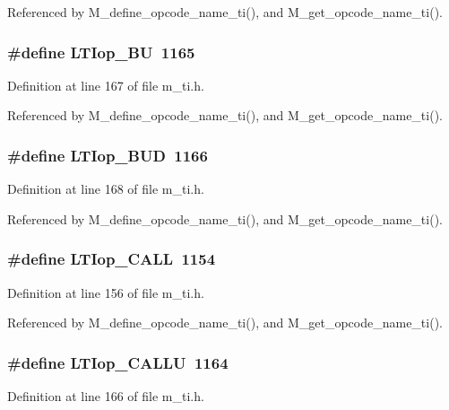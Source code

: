 Referenced by M\_\-define\_\-opcode\_\-name\_\-ti(), and M\_\-get\_\-opcode\_\-name\_\-ti().
\subsubsection{\setlength{\rightskip}{0pt plus 5cm}\#define LTIop\_\-BU~1165}\label{m__ti_8h_b665a3000679f7736a66405d190a02af}




Definition at line 167 of file m\_\-ti.h.

Referenced by M\_\-define\_\-opcode\_\-name\_\-ti(), and M\_\-get\_\-opcode\_\-name\_\-ti().
\subsubsection{\setlength{\rightskip}{0pt plus 5cm}\#define LTIop\_\-BUD~1166}\label{m__ti_8h_4ccb68e4e7d0cdf26cd72d05483ed5a4}




Definition at line 168 of file m\_\-ti.h.

Referenced by M\_\-define\_\-opcode\_\-name\_\-ti(), and M\_\-get\_\-opcode\_\-name\_\-ti().
\subsubsection{\setlength{\rightskip}{0pt plus 5cm}\#define LTIop\_\-CALL~1154}\label{m__ti_8h_1d3ac2200273914085c8a46646296c58}




Definition at line 156 of file m\_\-ti.h.

Referenced by M\_\-define\_\-opcode\_\-name\_\-ti(), and M\_\-get\_\-opcode\_\-name\_\-ti().
\subsubsection{\setlength{\rightskip}{0pt plus 5cm}\#define LTIop\_\-CALLU~1164}\label{m__ti_8h_41eb9d37282ea717dc673c0b9097407e}




Definition at line 166 of file m\_\-ti.h.

